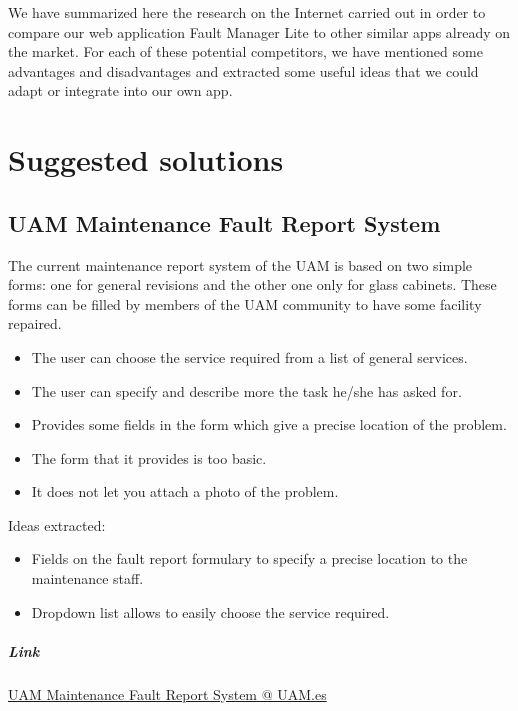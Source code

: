 \newcommand{\adv}{\item[\textcolor{green!60!black}{\checkmark}]}
\newcommand{\dsv}{\item[\textcolor{red!60!black}{$\times$}]}

We have summarized here the research on the Internet carried out in order to compare our web application Fault Manager Lite to other similar apps already on the market. For each of these potential competitors, we have mentioned some advantages and disadvantages and extracted some useful ideas that we could adapt or integrate into our own app.

\section{Suggested solutions}

\subsection{UAM Maintenance Fault Report System}

The current maintenance report system of the UAM is based on two simple forms: one for general revisions and the other one only for glass cabinets. These forms can be filled by members of the UAM community to have some facility repaired.

\begin{itemize}
\adv The user can choose the service required from a list of general services.
\adv The user can specify  and describe more the task he/she has asked for.
\adv Provides some fields in the form which give a precise location of the problem.
\dsv The form that it provides is too basic.
\dsv It does not let you attach a photo of the problem.
\end{itemize}

Ideas extracted:

\begin{itemize}
\item Fields on the fault report formulary to specify a precise location to the maintenance staff.
\item Dropdown list allows to easily choose the service required.
\end{itemize}

\subparagraph{Link} \href{http://www.uam.es/ss/Satellite/es/1234886352057/1242647722813/servicio/servicio/Servicio_de_Mantenimiento.htm}{UAM Maintenance Fault Report System @ UAM.es}

